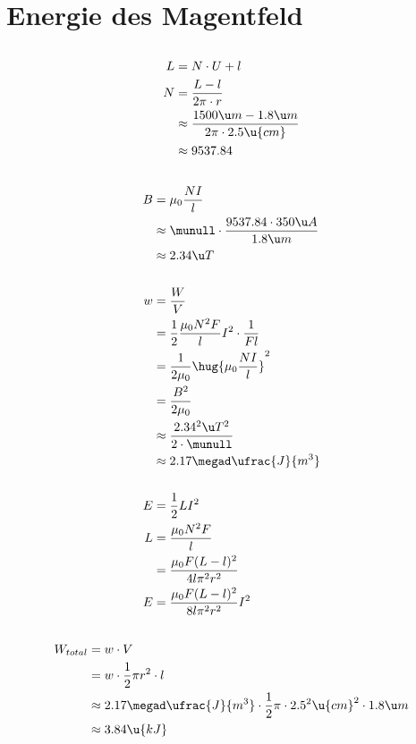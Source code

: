 \documentclass[11pt]{article}
\begin{document}
\section{Energie des Magentfeld}
\subsection{}
\begin{align*}
    L &= N\cdot U + l\\
    N &= \frac{L-l}{2\pi \cdot r}\\
    &\approx \frac{1500\u m - 1.8\u m}{2\pi \cdot 2.5\u{cm}}\\
    &\approx 9537.84
\end{align*}

\subsection{}
\begin{align*}
    B &= \mu_0 \frac {NI}l\\
    &\approx \munull \cdot \frac{9537.84 \cdot 350\u A}{1.8\u m}\\
    &\approx 2.34 \u T\\
    \\
    w &= \frac WV\\
    &= \frac 12 \frac{\mu_0 N^2 F }lI^2 \cdot \frac{1}{F l}\\
    &= \frac 1{2\mu_0} \hug{\mu_0 \frac {NI}l}^2 \\
    &= \frac{B^2}{2\mu_0}\\
    &\approx \frac{2.34^2 \u T^2}{2\cdot \munull}\\
    &\approx 2.17\megad \ufrac{J}{m^3}\\
    \\
    E &= \frac 12 L I^2\\
    L &= \frac{\mu_0 N^2 F }l\\
    &= \frac{\mu_0 F(L-l)^2}{4l\pi^2 r^2 }\\
    E &= \frac{\mu_0 F(L-l)^2}{8 l\pi^2 r^2 } I^2\\
\end{align*}

\subsection{}
\begin{align*}
    W_{total} &= w \cdot V\\
    &= w \cdot \frac12 \pi r^2 \cdot l \\
    &\approx 2.17\megad \ufrac{J}{m^3} \cdot \frac12 \pi \cdot 2.5^2\u{cm}^2 \cdot 1.8 \u m \\
    &\approx 3.84\u{kJ}
\end{align*}
\end{document}
